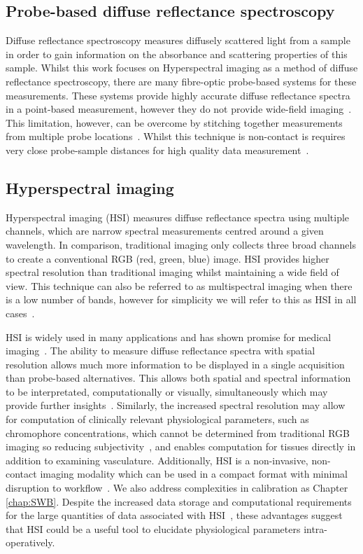 \subsection{Probe-based diffuse reflectance spectroscopy}
Diffuse reflectance spectroscopy measures diffusely scattered light from a sample in order to gain information on the absorbance and scattering properties of this sample. Whilst this work focuses on Hyperspectral imaging as a method of diffuse reflectance spectroscopy, there are many fibre-optic probe-based systems for these measurements. These systems provide highly accurate diffuse reflectance spectra in a point-based measurement, however they do not provide wide-field imaging~\cite{Nishidate2015}. This limitation, however, can be overcome by stitching together measurements from multiple probe locations~\cite{Thrapp2020}. Whilst this technique is non-contact is requires very close probe-sample distances for high quality data measurement~\cite{Nishidate2015}. 

\subsection{Hyperspectral imaging}
Hyperspectral imaging (HSI) measures diffuse reflectance spectra using multiple channels, which are narrow spectral measurements centred around a given wavelength. In comparison, traditional imaging only collects three broad channels to create a conventional RGB (red, green, blue) image. HSI provides higher spectral resolution than traditional imaging whilst maintaining a wide field of view. This technique can also be referred to as multispectral imaging when there is a low number of bands, however for simplicity we will refer to this as HSI in all cases~\cite{Clancy2020}. 

HSI is widely used in many applications and has shown promise for medical imaging~\cite{Lu2014,Giannoni2018,Calin2014,Shapey2019}. The ability to measure diffuse reflectance spectra with spatial resolution allows much more information to be displayed in a single acquisition than probe-based alternatives. This allows both spatial and spectral information to be interpretated, computationally or visually, simultaneously which may provide further insights~\cite{Seidlitz2022}. Similarly, the increased spectral resolution may allow for computation of clinically relevant physiological parameters, such as chromophore concentrations, which cannot be determined from traditional RGB imaging so reducing subjectivity~\cite{Seidlitz2022}, and enables computation for tissues directly in addition to examining vasculature. Additionally, HSI is a non-invasive, non-contact imaging modality which can be used in a compact format with minimal disruption to workflow~\cite{Thoenissen2023, Ebner2021, MacCormac2023}. We also address complexities in calibration as Chapter \ref{chap:SWB}. Despite the increased data storage and computational requirements for the large quantities of data associated with HSI~\cite{Altamimi2022}, these advantages suggest that HSI could be a useful tool to elucidate physiological parameters intra-operatively. 

